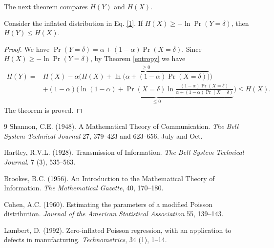 \documentclass[twoside]{article}
\begin{document}
The next theorem compares $H(Y)$ and $H(X)$. 


\begin{thm}
	Consider the inflated distribution in Eq. \eqref{1}. If $H(X)\geq-\ln \Pr(Y=\delta)$, then $H(Y)\leq H(X)$.
\end{thm}

\begin{proof}
	We have $\Pr(Y=\delta)=\alpha+(1-\alpha)\Pr(X=\delta)$. Since $H(X)\geq-\ln \Pr(Y=\delta)$, by Theorem \ref{entropy} we have
	\begin{align*}
		H(Y)=&H(X)-\alpha\bigg(\overbrace{ H(X)+\ln\big(\alpha+(1-\alpha)\Pr(X=\delta)\big)}^{\geq0}\bigg)\\
		&+(1-\alpha)\bigg(\underbrace{\ln(1-\alpha)+\Pr(X=\delta)\ln\frac{(1-\alpha)\Pr(X=\delta)}{\alpha+(1-\alpha)\Pr(X=\delta)}}_{\leq0}\bigg)\leq H(X).
	\end{align*}
	The theorem is proved.
\end{proof}






\begin{thebibliography}{9}
Shannon, C.E. (1948). A Mathematical Theory of Communication. \textit{The Bell System Technical Journal} 27, 379--423 and 623--656, July and Oct.

Hartley, R.V.L. (1928). Transmission of Information. \textit{The Bell System Technical Journal}. 7 (3), 535--563.

Brookes, B.C. (1956). An Introduction to the Mathematical Theory of Information. \textit{The Mathematical Gazette},  40,  170--180. 

Cohen, A.C. (1960). Estimating the parameters of a modified Poisson distribution. \textit{Journal of the American Statistical Association} 55, 139--143.

Lambert, D. (1992). Zero-inflated Poisson regression, with an application to defects in manufacturing. \textit{Technometrics}, 34 (1),  1--14.

\end{thebibliography}
 
\end{document}
